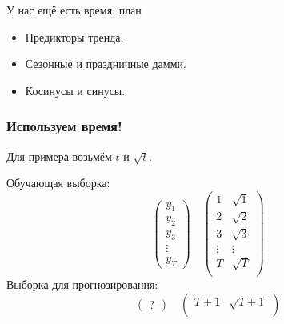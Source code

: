 
\begin{frame} %



\end{frame}



\begin{frame}{У нас ещё есть время: план}
  \begin{itemize}[<+->]
    \item Предикторы \alert{тренда}.
    \item \alert{Сезонные} и \alert{праздничные} дамми.
    \item \alert{Косинусы} и \alert{синусы}.
  \end{itemize}

\end{frame}

\begin{frame}
  \frametitle{Используем время!}

  Для примера возьмём $t$ и $\sqrt{t}$. 
  \pause

  \alert{Обучающая} выборка:
  \[
  \begin{pmatrix}
    y_1 \\
    y_2 \\
    y_3 \\
    \vdots \\
    y_T 
  \end{pmatrix}  \quad 
  \begin{pmatrix}
    1 & \sqrt{1} \\
    2 & \sqrt{2} \\
    3 & \sqrt{3} \\
    \vdots & \vdots \\
    T & \sqrt{T} \\ 
  \end{pmatrix}
  \]
  \pause
  Выборка для \alert{прогнозирования}:
  \[
  \begin{pmatrix}
    ? 
  \end{pmatrix}  \quad 
  \begin{pmatrix}
    T+1 & \sqrt{T+1} \\ 
  \end{pmatrix}
  \]
  
\end{frame}


